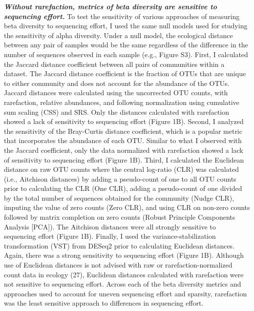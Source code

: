 \documentclass[
]{article}
\begin{document}
\textbf{\emph{Without rarefaction, metrics of beta diversity are
sensitive to sequencing effort.}} To test the sensitivity of various
approaches of measuring beta diversity to sequencing effort, I used the
same null models used for studying the sensitivity of alpha diversity.
Under a null model, the ecological distance between any pair of samples
would be the same regardless of the difference in the number of
sequences observed in each sample (e.g., Figure S3). First, I calculated
the Jaccard distance coefficient between all pairs of communities within
a dataset. The Jaccard distance coefficient is the fraction of OTUs that
are unique to either community and does not account for the abundance of
the OTUs. Jaccard distances were calculated using the uncorrected OTU
counts, with rarefaction, relative abundances, and following
normalization using cumulative sum scaling (CSS) and SRS. Only the
distances calculated with rarefaction showed a lack of sensitivity to
sequencing effort (Figure 1B). Second, I analyzed the sensitivity of the
Bray-Curtis distance coefficient, which is a popular metric that
incorporates the abundance of each OTU. Similar to what I observed with
the Jaccard coefficient, only the data normalized with rarefaction
showed a lack of sensitivity to sequencing effort (Figure 1B). Third, I
calculated the Euclidean distance on raw OTU counts where the central
log-ratio (CLR) was calculated (i.e., Aitchison distances) by adding a
pseudo-count of one to all OTU counts prior to calculating the CLR (One
CLR), adding a pseudo-count of one divided by the total number of
sequences obtained for the community (Nudge CLR), imputing the value of
zero counts (Zero CLR), and using CLR on non-zero counts followed by
matrix completion on zero counts (Robust Principle Components Analysis
{[}PCA{]}). The Aitchison distances were all strongly sensitive to
sequencing effort (Figure 1B). Finally, I used the
variance-stabilization transformation (VST) from DESeq2 prior to
calculating Euclidean distances. Again, there was a strong sensitivity
to sequencing effort (Figure 1B). Although use of Euclidean distances is
not advised with raw or rarefaction-normalized count data in ecology
(27), Euclidean distances calculated with rarefaction were not sensitive
to sequencing effort. Across each of the beta diversity metrics and
approaches used to account for uneven sequencing effort and sparsity,
rarefaction was the least sensitive approach to differences in
sequencing effort.
\end{document}
